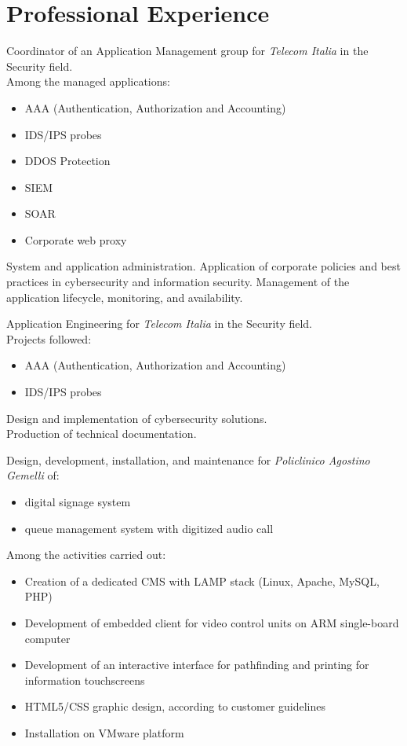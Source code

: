 \section{Professional Experience}
        {Coordinator of an Application Management group for \emph{Telecom Italia} in the Security field.\\ Among the managed applications: \begin{itemize}
          \item AAA (Authentication, Authorization and Accounting)
          \item IDS/IPS probes
          \item DDOS Protection
          \item SIEM
          \item SOAR
          \item Corporate web proxy
          \end{itemize}
          System and application administration. Application of corporate policies and best practices in cybersecurity and information security. Management of the application lifecycle, monitoring, and availability.}
\vspace{3mm}
        {Application Engineering for \emph{Telecom Italia} in the Security field. \\ Projects followed:
          \begin{itemize}
          \item AAA (Authentication, Authorization and Accounting)
          \item IDS/IPS probes
        \end{itemize}
          Design and implementation of cybersecurity solutions.\\
          Production of technical documentation.}
\vspace{3mm}
        {Design, development, installation, and maintenance for \emph{Policlinico Agostino Gemelli} of:
          \begin{itemize}
          \item digital signage system
          \item queue management system with digitized audio call
          \end{itemize}
          Among the activities carried out:
          \begin{itemize}
          \item Creation of a dedicated CMS with LAMP stack (Linux, Apache, MySQL, PHP)
          \item Development of embedded client for video control units on ARM single-board computer
          \item Development of an interactive interface for pathfinding and printing for information touchscreens
          \item HTML5/CSS graphic design, according to customer guidelines
          \item Installation on VMware platform
          \end{itemize}}
